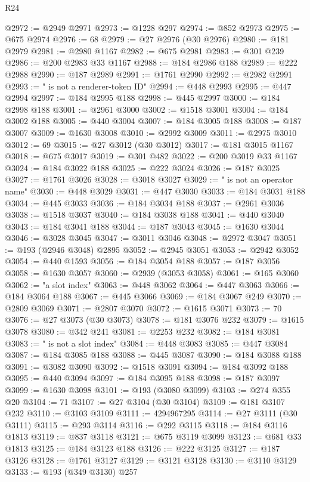 \begin{lexlean}{R24}
\begin{coremodule}
@2972 := @2949 @2971
@2973 := @1228 @297
@2974 := @852 @2973
@2975 := @675 @2974
@2976 := 68
@2979 := @27 @2976 (@30 @2976)
@2980 := @181 @2979
@2981 := @2980 @1167
@2982 := @675 @2981
@2983 := @301 @239
@2986 := @200 @2983 @33 @1167
@2988 := @184 @2986 @188
@2989 := @222 @2988
@2990 := @187 @2989
@2991 := @1761 @2990
@2992 := @2982 @2991
@2993 := " is not a renderer-token ID"
@2994 := @448 @2993
@2995 := @447 @2994
@2997 := @184 @2995 @188
@2998 := @445 @2997
@3000 := @184 @2998 @188
@3001 := @2961 @3000
@3002 := @1518 @3001
@3004 := @184 @3002 @188
@3005 := @440 @3004
@3007 := @184 @3005 @188
@3008 := @187 @3007
@3009 := @1630 @3008
@3010 := @2992 @3009
@3011 := @2975 @3010
@3012 := 69
@3015 := @27 @3012 (@30 @3012)
@3017 := @181 @3015 @1167
@3018 := @675 @3017
@3019 := @301 @482
@3022 := @200 @3019 @33 @1167
@3024 := @184 @3022 @188
@3025 := @222 @3024
@3026 := @187 @3025
@3027 := @1761 @3026
@3028 := @3018 @3027
@3029 := " is not an operator name"
@3030 := @448 @3029
@3031 := @447 @3030
@3033 := @184 @3031 @188
@3034 := @445 @3033
@3036 := @184 @3034 @188
@3037 := @2961 @3036
@3038 := @1518 @3037
@3040 := @184 @3038 @188
@3041 := @440 @3040
@3043 := @184 @3041 @188
@3044 := @187 @3043
@3045 := @1630 @3044
@3046 := @3028 @3045
@3047 := @3011 @3046
@3048 := @2972 @3047
@3051 := @193 (@2946 @3048) @2895
@3052 := @2945 @3051
@3053 := @2942 @3052
@3054 := @440 @1593
@3056 := @184 @3054 @188
@3057 := @187 @3056
@3058 := @1630 @3057
@3060 := @2939 (@3053 @3058)
@3061 := @165 @3060
@3062 := "a slot index"
@3063 := @448 @3062
@3064 := @447 @3063
@3066 := @184 @3064 @188
@3067 := @445 @3066
@3069 := @184 @3067 @249
@3070 := @2809 @3069
@3071 := @2807 @3070
@3072 := @1615 @3071
@3073 := 70
@3076 := @27 @3073 (@30 @3073)
@3078 := @181 @3076 @232
@3079 := @1615 @3078
@3080 := @342 @241
@3081 := @2253 @232
@3082 := @184 @3081
@3083 := " is not a slot index"
@3084 := @448 @3083
@3085 := @447 @3084
@3087 := @184 @3085 @188
@3088 := @445 @3087
@3090 := @184 @3088 @188
@3091 := @3082 @3090
@3092 := @1518 @3091
@3094 := @184 @3092 @188
@3095 := @440 @3094
@3097 := @184 @3095 @188
@3098 := @187 @3097
@3099 := @1630 @3098
@3101 := @193 (@3080 @3099)
@3103 := @274 @355 @20
@3104 := 71
@3107 := @27 @3104 (@30 @3104)
@3109 := @181 @3107 @232
@3110 := @3103 @3109
@3111 := 4294967295
@3114 := @27 @3111 (@30 @3111)
@3115 := @293 @3114
@3116 := @292 @3115
@3118 := @184 @3116 @1813
@3119 := @837 @3118
@3121 := @675 @3119 @3099
@3123 := @681 @33 @1813
@3125 := @184 @3123 @188
@3126 := @222 @3125
@3127 := @187 @3126
@3128 := @1761 @3127
@3129 := @3121 @3128
@3130 := @3110 @3129
@3133 := @193 (@349 @3130) @257

\end{coremodule}
\end{lexlean}
